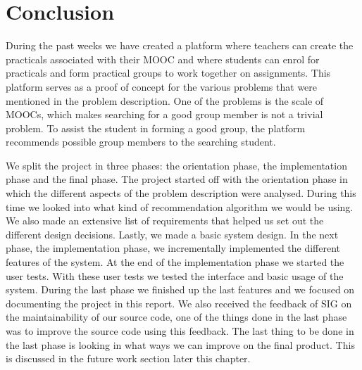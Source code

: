 \chapter{Conclusion}
\label{sec:conclusion}
During the past weeks we have created a platform where teachers can create the practicals associated with their MOOC and where students can enrol for practicals and form practical groups to work together on assignments.
This platform serves as a proof of concept for the various problems that were mentioned in the problem description.
One of the problems is the scale of MOOCs, which makes searching for a good group member is not a trivial problem.
To assist the student in forming a good group, the platform recommends possible group members to the searching student.

We split the project in three phases: the orientation phase, the implementation phase and the final phase.
The project started off with the orientation phase in which the different aspects of the problem description were analysed.
During this time we looked into what kind of recommendation algorithm we would be using.
We also made an extensive list of requirements that helped us set out the different design decisions.
Lastly, we made a basic system design.
In the next phase, the implementation phase, we incrementally implemented the different features of the system.
At the end of the implementation phase we started the user tests.
With these user tests we tested the interface and basic usage of the system.
During the last phase we finished up the last features and we focused on documenting the project in this report.
We also received the feedback of SIG on the maintainability of our source code, one of the things done in the last phase was to improve the source code using this feedback.
The last thing to be done in the last phase is looking in what ways we can improve on the final product.
This is discussed in the future work section later this chapter.

